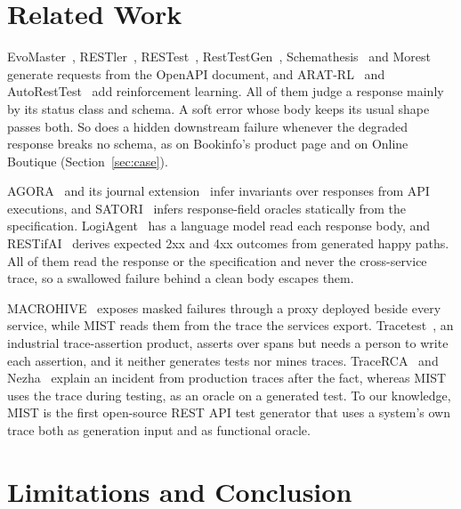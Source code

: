 \documentclass[10pt,conference]{IEEEtran}
\begin{document}
\section{Related Work}\label{sec:rw}

EvoMaster~\cite{Arcuri2019EvoMasterTOSEM}, RESTler~\cite{Atlidakis2019RESTler}, RESTest~\cite{MartinLopez2021RESTest}, RestTestGen~\cite{Corradini2022RestTestGen}, Schemathesis~\cite{HatfieldDodds2022Schemathesis} and Morest~\cite{Liu2022MoRest} generate requests from the OpenAPI document, and ARAT-RL~\cite{Kim2023ARATRL} and AutoRestTest~\cite{Stennett2025AutoRestTest,Kim2025AutoRestTestSPDG} add reinforcement learning. All of them judge a response mainly by its status class and schema. A soft error whose body keeps its usual shape passes both. So does a hidden downstream failure whenever the degraded response breaks no schema, as on Bookinfo's product page and on Online Boutique (Section~\ref{sec:case}).

AGORA~\cite{Alonso2023AGORA} and its journal extension~\cite{Alonso2026TOSEMOracles} infer invariants over responses from API executions, and SATORI~\cite{Alonso2025SATORI} infers response-field oracles statically from the specification. LogiAgent~\cite{Zhang2025LogiAgent} has a language model read each response body, and RESTifAI~\cite{Kogler2025RESTifAI} derives expected 2xx and 4xx outcomes from generated happy paths. All of them read the response or the specification and never the cross-service trace, so a swallowed failure behind a clean body escapes them.

MACROHIVE~\cite{Giamattei2022MACROHIVE} exposes masked failures through a proxy deployed beside every service, while MIST reads them from the trace the services export. Tracetest~\cite{Tracetest}, an industrial trace-assertion product, asserts over spans but needs a person to write each assertion, and it neither generates tests nor mines traces. TraceRCA~\cite{Li2021TraceRCA} and Nezha~\cite{Yu2023Nezha} explain an incident from production traces after the fact, whereas MIST uses the trace during testing, as an oracle on a generated test. To our knowledge, MIST is the first open-source REST API test generator that uses a system's own trace both as generation input and as functional oracle.

\section{Limitations and Conclusion}\label{sec:concl}
\end{document}
